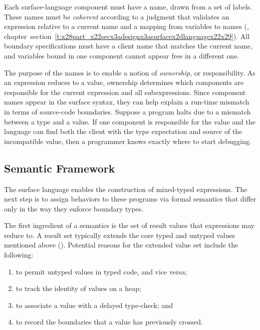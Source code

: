 \documentclass[ twoside,open=right,titlepage,numbers=noenddot,headinclude,%
                footinclude=true,cleardoublepage=empty,abstract=off,
                BCOR=5mm,paper=a4,fontsize=11pt,%
                ngerman,american,%
                parts,pdfspacing]{scrreprt}
\newcommand{\SecRef}[2]{section~#1}
\newcommand{\SecRefLocal}[3]{\hyperref[#1]{\SecRef{#2}{#3}}}
\newlength{\stabLeft}
\newcommand{\atItemizeStart}[0]{\addtolength{\stabLeft}{\labelsep}
                                \addtolength{\stabLeft}{\labelwidth}}
\newcommand{\Ssubsubsection}[2]{\subsubsection[#1]{#2}}
\renewcommand{\Ssubsubsection}[2]{\subsection[#1]{#2}}
\renewcommand{\SecRefLocal}[3]{section~\ref{#1}}
\begin{document}
Each surface{-}language component must have a name,
 drawn from a set \relax{$\sowner$} of labels.
These names must be \emph{coherent} according to a judgment that validates an
 expression relative to a current name and a mapping from variables to names
 (, chapter~\SecRefLocal{t:x28part_x22secx3adesignx3asurfacex2dlanguagex22x29}{4.5.1}{Surface Syntax, Types, and Ownership}).
All boundary specifications must have a client name that matches the current
 name, and variables bound in one component cannot appear free in a different
 one.

The purpose of the names is to enable a notion of \emph{ownership}, or responsibility.
As an expression reduces to a value, ownership determines which components are
 responsible for the current expression and all subexpressions.
Since component names appear in the surface syntax, they can help explain
 a run{-}time mismatch in terms of source{-}code boundaries.
Suppose a program halts due to a mismatch between a type and a value.
If one component is responsible for the value and the language can find both the
 client with the type expectation and source of the incompatible value, then a
 programmer knows exactly where to start debugging.

\Ssubsubsection{Semantic Framework}{Semantic Framework}\label{t:x28part_x22secx3adesignx3asemanticx2dframeworkx22x29}

The surface language enables the construction of mixed{-}typed expressions.
The next step is to assign behaviors to these programs via formal semantics
 that differ only in the way they enforce boundary types.

The first ingredient of a semantics is the set of result values \relax{$\svalue$} that
 expressions may reduce to.
A result set typically extends the core typed and untyped values mentioned above
 (\relax{$\svalue \supseteq \svaluestat \cup \svaluedyn$}).
Potential reasons for the extended value set include the following:


\noindent \begin{enumerate}\atItemizeStart

\item to permit untyped values in typed code, and vice versa;

\item to track the identity of values on a heap;

\item \label{val:monitor}
to associate a value with a delayed type{-}check; and

\item \label{val:trace}
to record the boundaries that a value has previously crossed.\end{enumerate}
\end{document}
